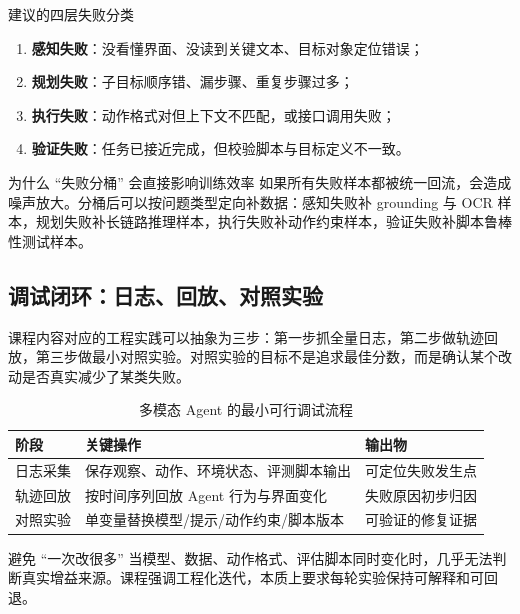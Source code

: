 \documentclass[a4paper]{article}
\begin{document}
\begin{importantbox}{建议的四层失败分类}
\begin{enumerate}
    \item \textbf{感知失败}：没看懂界面、没读到关键文本、目标对象定位错误；
    \item \textbf{规划失败}：子目标顺序错、漏步骤、重复步骤过多；
    \item \textbf{执行失败}：动作格式对但上下文不匹配，或接口调用失败；
    \item \textbf{验证失败}：任务已接近完成，但校验脚本与目标定义不一致。
\end{enumerate}
\end{importantbox}

\begin{knowledgebox}{为什么 ``失败分桶'' 会直接影响训练效率}
如果所有失败样本都被统一回流，会造成噪声放大。分桶后可以按问题类型定向补数据：感知失败补 grounding 与 OCR 样本，规划失败补长链路推理样本，执行失败补动作约束样本，验证失败补脚本鲁棒性测试样本。
\end{knowledgebox}

\subsection{调试闭环：日志、回放、对照实验}
课程内容对应的工程实践可以抽象为三步：第一步抓全量日志，第二步做轨迹回放，第三步做最小对照实验。对照实验的目标不是追求最佳分数，而是确认某个改动是否真实减少了某类失败。

\begin{table}[H]
\centering
\begin{tabular}{p{2.6cm}p{4.6cm}p{4.0cm}}
\toprule
\textbf{阶段} & \textbf{关键操作} & \textbf{输出物} \\
\midrule
日志采集 & 保存观察、动作、环境状态、评测脚本输出 & 可定位失败发生点 \\
轨迹回放 & 按时间序列回放 Agent 行为与界面变化 & 失败原因初步归因 \\
对照实验 & 单变量替换模型/提示/动作约束/脚本版本 & 可验证的修复证据 \\
\bottomrule
\end{tabular}
\caption{多模态 Agent 的最小可行调试流程}
\end{table}

\begin{warningbox}{避免 ``一次改很多''}
当模型、数据、动作格式、评估脚本同时变化时，几乎无法判断真实增益来源。课程强调工程化迭代，本质上要求每轮实验保持可解释和可回退。
\end{warningbox}
\end{document}
